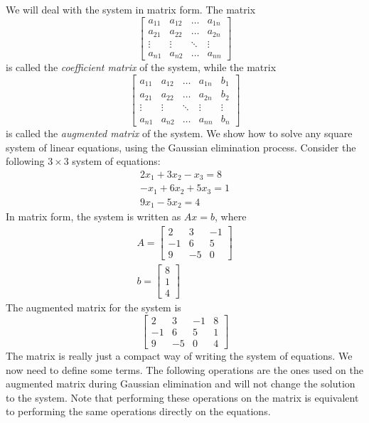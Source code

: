 \documentclass[../main.tex]{subfiles}
\begin{document}
We will deal with the system in matrix form. The matrix
$$
\left[\begin{array}{llll}
a_{11} & a_{12} & \ldots & a_{1 n} \\
a_{21} & a_{22} & \ldots & a_{2 n} \\
\vdots & \vdots & \ddots & \vdots \\
a_{n 1} & a_{n 2} & \ldots & a_{n n}
\end{array}\right]
$$
is called the \emph{coefficient matrix} of the system, while the matrix
$$
\left[\begin{array}{cccc|c}
a_{11} & a_{12} & \ldots & a_{1 n} & b_{1} \\
a_{21} & a_{22} & \ldots & a_{2 n} & b_{2} \\
\vdots & \vdots & \ddots & \vdots & \vdots \\
a_{n 1} & a_{n 2} & \ldots & a_{n n} & b_{n}
\end{array}\right]
$$
is called the \emph{augmented matrix} of the system. We show how to solve any square system of linear equations, using the Gaussian elimination process. Consider the following $3 \times 3$ system of equations:
$$
\begin{array}{r}
2 x_{1}+3 x_{2}-x_{3}=8 \\
-x_{1}+6 x_{2}+5 x_{3}=1 \\
9 x_{1}-5 x_{2}=4
\end{array}
$$
In matrix form, the system is written as $A x=b$, where
$$
\begin{array}{l}
A=\left[\begin{array}{ccc}
2 & 3 & -1 \\
-1 & 6 & 5 \\
9 & -5 & 0
\end{array}\right] \\
b=\left[\begin{array}{l}
8 \\
1 \\
4
\end{array}\right]
\end{array}
$$
The augmented matrix for the system is
$$
\left[\begin{array}{ccc|c}
2 & 3 & -1 & 8 \\
-1 & 6 & 5 & 1 \\
9 & -5 & 0 & 4
\end{array}\right]
$$
The matrix is really just a compact way of writing the system of equations. We now need to define some terms. The following operations are the ones used on the augmented matrix during Gaussian elimination and will not change the solution to the system. Note that performing these operations on the matrix is equivalent to performing the same operations directly on the equations.
\end{document}
